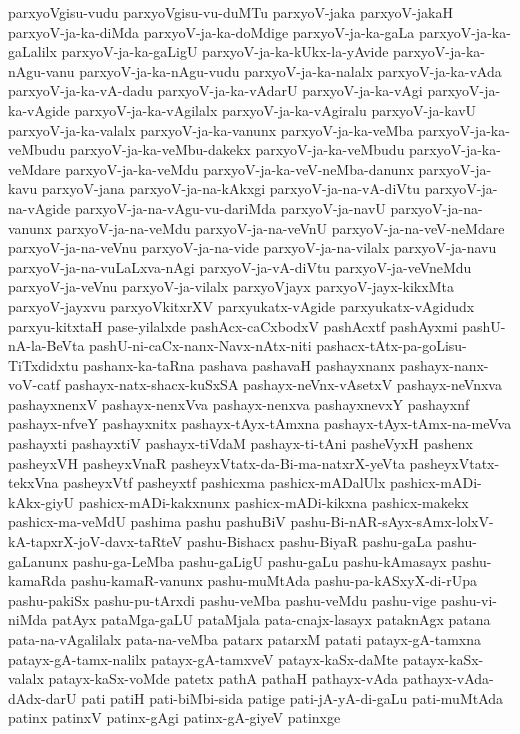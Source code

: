 {parxyoVgisu-vudu
parxyoVgisu-vu-duMTu
parxyoV-jaka
parxyoV-jakaH
parxyoV-ja-ka-diMda
parxyoV-ja-ka-doMdige
parxyoV-ja-ka-gaLa
parxyoV-ja-ka-gaLalilx
parxyoV-ja-ka-gaLigU
parxyoV-ja-ka-kUkx-la-yAvide
parxyoV-ja-ka-nAgu-vanu
parxyoV-ja-ka-nAgu-vudu
parxyoV-ja-ka-nalalx
parxyoV-ja-ka-vAda
parxyoV-ja-ka-vA-dadu
parxyoV-ja-ka-vAdarU
parxyoV-ja-ka-vAgi
parxyoV-ja-ka-vAgide
parxyoV-ja-ka-vAgilalx
parxyoV-ja-ka-vAgiralu
parxyoV-ja-kavU
parxyoV-ja-ka-valalx
parxyoV-ja-ka-vanunx
parxyoV-ja-ka-veMba
parxyoV-ja-ka-veMbudu
parxyoV-ja-ka-veMbu-dakekx
parxyoV-ja-ka-veMbudu
parxyoV-ja-ka-veMdare
parxyoV-ja-ka-veMdu
parxyoV-ja-ka-veV-neMba-danunx
parxyoV-ja-kavu
parxyoV-jana
parxyoV-ja-na-kAkxgi
parxyoV-ja-na-vA-diVtu
parxyoV-ja-na-vAgide
parxyoV-ja-na-vAgu-vu-dariMda
parxyoV-ja-navU
parxyoV-ja-na-vanunx
parxyoV-ja-na-veMdu
parxyoV-ja-na-veVnU
parxyoV-ja-na-veV-neMdare
parxyoV-ja-na-veVnu
parxyoV-ja-na-vide
parxyoV-ja-na-vilalx
parxyoV-ja-navu
parxyoV-ja-na-vuLaLxva-nAgi
parxyoV-ja-vA-diVtu
parxyoV-ja-veVneMdu
parxyoV-ja-veVnu
parxyoV-ja-vilalx
parxyoVjayx
parxyoV-jayx-kikxMta
parxyoV-jayxvu
parxyoVkitxrXV
parxyukatx-vAgide
parxyukatx-vAgidudx
parxyu-kitxtaH
pase-yilalxde
pashAcx-caCxbodxV
pashAcxtf
pashAyxmi
pashU-nA-la-BeVta
pashU-ni-caCx-nanx-Navx-nAtx-niti
pashacx-tAtx-pa-goLisu-TiTxdidxtu
pashanx-ka-taRna
pashava
pashavaH
pashayxnanx
pashayx-nanx-voV-catf
pashayx-natx-shacx-kuSxSA
pashayx-neVnx-vAsetxV
pashayx-neVnxva
pashayxnenxV
pashayx-nenxVva
pashayx-nenxva
pashayxnevxY
pashayxnf
pashayx-nfveY
pashayxnitx
pashayx-tAyx-tAmxna
pashayx-tAyx-tAmx-na-meVva
pashayxti
pashayxtiV
pashayx-tiVdaM
pashayx-ti-tAni
pasheVyxH
pashenx
pasheyxVH
pasheyxVnaR
pasheyxVtatx-da-Bi-ma-natxrX-yeVta
pasheyxVtatx-tekxVna
pasheyxVtf
pasheyxtf
pashicxma
pashicx-mADalUlx
pashicx-mADi-kAkx-giyU
pashicx-mADi-kakxnunx
pashicx-mADi-kikxna
pashicx-makekx
pashicx-ma-veMdU
pashima
pashu
pashuBiV
pashu-Bi-nAR-sAyx-sAmx-lolxV-kA-tapxrX-joV-davx-taRteV
pashu-Bishacx
pashu-BiyaR
pashu-gaLa
pashu-gaLanunx
pashu-ga-LeMba
pashu-gaLigU
pashu-gaLu
pashu-kAmasayx
pashu-kamaRda
pashu-kamaR-vanunx
pashu-muMtAda
pashu-pa-kASxyX-di-rUpa
pashu-pakiSx
pashu-pu-tArxdi
pashu-veMba
pashu-veMdu
pashu-vige
pashu-vi-niMda
patAyx
pataMga-gaLU
pataMjala
pata-cnajx-lasayx
pataknAgx
patana
pata-na-vAgalilalx
pata-na-veMba
patarx
patarxM
patati
patayx-gA-tamxna
patayx-gA-tamx-nalilx
patayx-gA-tamxveV
patayx-kaSx-daMte
patayx-kaSx-valalx
patayx-kaSx-voMde
patetx
pathA
pathaH
pathayx-vAda
pathayx-vAda-dAdx-darU
pati
patiH
pati-biMbi-sida
patige
pati-jA-yA-di-gaLu
pati-muMtAda
patinx
patinxV
patinx-gAgi
patinx-gA-giyeV
patinxge
}
